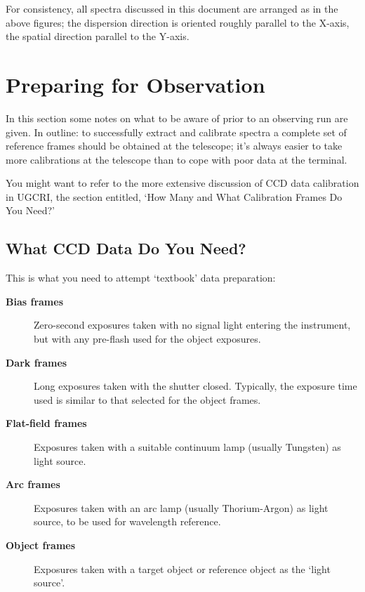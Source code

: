 \documentclass[twoside,11pt]{article}
\newcommand{\stardocinitials}  {SC}
\newcommand{\stardocnumber}    {7.2}
\newcommand{\stardocname}{\stardocinitials /\stardocnumber}
\newcommand{\htmlref}[2]{#1}
\newcommand{\xlabel}[1]{}
\newcommand{\mlabel}[1]{\xlabel{#1}\label{#1}}
\begin{document}
For consistency, all spectra discussed in this document are arranged
as in the above figures; the dispersion direction is oriented roughly
parallel to the X-axis, the spatial direction parallel to the Y-axis.




\section{\mlabel{preparing_for_observing}Preparing for Observation}
\markboth{Preparing for Observation}{\stardocname}

In this section some notes on what to be aware of prior to an observing
run are given.
In outline: to successfully extract and calibrate spectra
a complete set of reference frames should be obtained at the telescope;
it's always easier to take more calibrations at the telescope than to
cope with poor data at the terminal.

You might want to refer to the more extensive discussion of
\htmlref{CCD}{gl_ccd} data calibration in UGCRI\cite{ugcri},
the section entitled, `How Many and What Calibration Frames
Do You Need?'


\subsection{What CCD Data Do You Need?}

This is what you need to attempt `textbook' data preparation:

\begin{description}

\item [{\bf Bias frames}]
      Zero-second exposures taken with no signal light entering the
      instrument, but with any pre-flash used for the object exposures.

\item [{\bf Dark frames}]
      Long exposures taken with the shutter closed.  Typically, the
      exposure time used is similar to that selected for the object
      frames.

\item [{\bf Flat-field frames}]
      Exposures taken with a suitable \htmlref{continuum}{gl_continuum}
      lamp (usually Tungsten) as light source.

\item [{\bf Arc frames}]
      Exposures taken with an \htmlref{arc lamp}{gl_arc}
      (usually Thorium-Argon) as
      light source, to be used for \htmlref{wavelength
      reference}{gl_wavelength}.

\item [{\bf Object frames}]
      Exposures taken with a target object or reference object as the
      `light source'.

\end{description}
\end{document}
